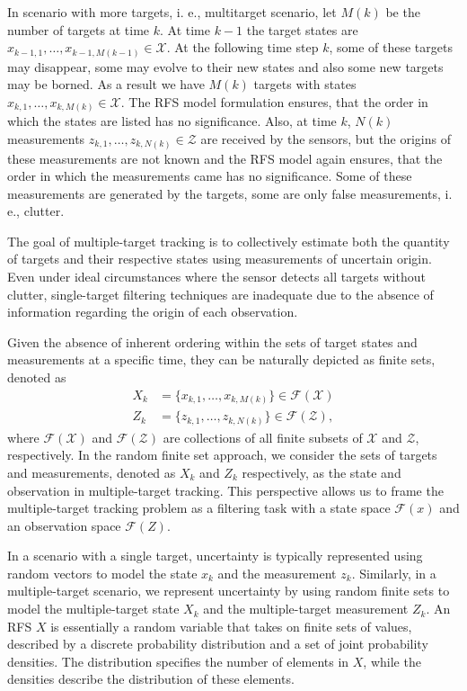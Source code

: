 In scenario with more targets, i. e., multitarget scenario, let $M(k)$ be the number of targets at time $k$. At time $k-1$ the target states are $x_{k-1,1}, \dots, x_{k-1,M(k-1)} \in \mathcal{X}$. At the following time step $k$, some of these targets may disappear, some may evolve to their new states and also some new targets may be borned. As a result we have $M(k)$ targets with states $x_{k,1},\dots, x_{k,M(k)} \in \mathcal{X}$. The RFS model formulation ensures, that the order in which the states are listed has no significance. Also, at time $k$, $N(k)$ measurements $z_{k,1},\dots,z_{k,N(k)} \in \mathcal{Z}$ are received by the sensors, but the origins of these measurements are not known and the RFS model again ensures, that the order in which the measurements came has no significance. Some of these measurements are generated by the targets, some are only false measurements, i. e., clutter.

The goal of multiple-target tracking is to collectively estimate both the quantity of targets and their respective states using measurements of uncertain origin. Even under ideal circumstances where the sensor detects all targets without clutter, single-target filtering techniques are inadequate due to the absence of information regarding the origin of each observation.

Given the absence of inherent ordering within the sets of target states and measurements at a specific time, they can be naturally depicted as finite sets, denoted as
\begin{align}
    X_k &= \{x_{k,1},\dots, x_{k,M(k)}\} \in \mathcal{F}(\mathcal{X}) \\
    Z_k &= \{z_{k,1},\dots, z_{k,N(k)}\} \in \mathcal{F}(\mathcal{Z}),
\end{align}
where $\mathcal{F}(\mathcal{X})$ and $\mathcal{F}(\mathcal{Z})$ are collections of all finite subsets of $\mathcal{X}$ and $\mathcal{Z}$, respectively. In the random finite set approach, we consider the sets of targets and measurements, denoted as $X_k$ and $Z_k$ respectively, as the state and observation in multiple-target tracking. This perspective allows us to frame the multiple-target tracking problem as a filtering task with a state space $\mathcal{F}(x)$ and an observation space $\mathcal{F}(Z)$.

In a scenario with a single target, uncertainty is typically represented using random vectors to model the state $x_k$ and the measurement $z_k$. Similarly, in a multiple-target scenario, we represent uncertainty by using random finite sets to model the multiple-target state $X_k$ and the multiple-target measurement $Z_k$. An RFS $X$ is essentially a random variable that takes on finite sets of values, described by a discrete probability distribution and a set of joint probability densities. The distribution specifies the number of elements in $X$, while the densities describe the distribution of these elements.

